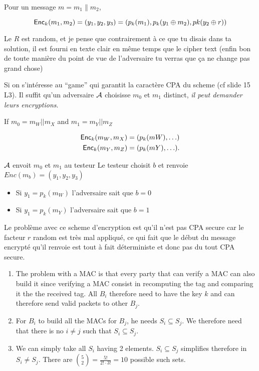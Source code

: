 \begin{solution}
  Pour un message $m = m_1 \| m_2$,

  \[ \operatorname{\mathsf{Enc}}_k(m_1, m_2) = (y_1, y_2, y_3)  =(p_k(m_1) , p_k(y_1 \oplus m_2), pk(y_2 \oplus r)) \]

  Le $R$ est random, et je pense que contrairement à ce que tu disais dans ta
  solution, il est fourni en texte clair en même temps que le cipher text
  (enfin bon de toute manière du point de vue de l'adversaire tu verras que
  ça ne change pas grand chose)

  Si on s'intéresse au ``game'' qui garantit la caractère CPA du scheme (cf slide 15 L3).
  Il suffit qu'un adversaire $\mathcal{A}$ choisisse $m_0$ et $m_1$ distinct, \emph{il peut demander
  leurs encryptions}.

  If $m_0 = m_W || m_X$ and $m_1 = m_Y || m_Z$

  \begin{align*}
    \operatorname{\mathsf{Enc}}_k(m_W,m_X) = (p_k(mW), \ldots)\\
    \operatorname{\mathsf{Enc}}_k(m_Y,m_Z) = (p_k(mY), \ldots).
  \end{align*}

  $\mathcal{A}$ envoit $m_0$ et $m_1$ au testeur
  Le testeur choisit $b$ et renvoie $Enc(m_b) = (y_1 ,y_2, y_3)$

  \begin{itemize}
    \item Si $y_1 = p_k(m_W)$ l'adversaire sait que $b = 0$
    \item Si $y_1 = p_k(m_Y)$ l'adversaire sait que $b = 1$
  \end{itemize}

  Le problème avec ce scheme d'encryption est qu'il n'est pas CPA secure car
  le facteur $r$ random est très mal appliqué, ce qui fait que le début du
  message encrypté qu'il renvoie est tout à fait déterministe et donc pas du
  tout CPA secure.
\end{solution}

\begin{solution}
  \begin{enumerate}
    \item
      The problem with a MAC is that every party that can verify a MAC can also build it since verifying a MAC consist
      in recomputing the tag and comparing it the the received tag.
      All $B_i$ therefore need to have the key $k$ and can therefore send valid packets to other $B_j$.
    \item
      For $B_i$ to build all the MACs for $B_j$, he needs $S_i \subseteq S_j$.
      We therefore need that there is no $i \neq j$ such that $S_i \subseteq S_j$.
    \item We can simply take all $S_i$ having 2 elements.
      $S_i \subseteq S_j$ simplifies therefore in $S_i \neq S_j$.
      There are ${5 \choose 2} = \frac{5!}{2! \cdot 3!} = 10$ possible such sets.
  \end{enumerate}
\end{solution}
